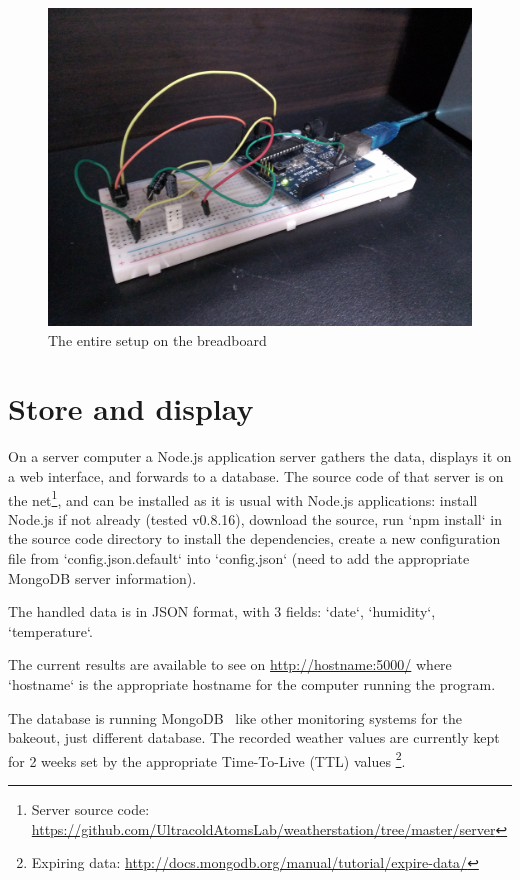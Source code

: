 \documentclass[12pt,a4paper]{article}
\begin{document}
\begin{figure}[ht!]
\centering
\includegraphics[width=140mm]{setup.jpg}
\caption{The entire setup on the breadboard}
\label{fig:setup}
\end{figure}

\section{Store and display}

On a server computer a Node.js application server gathers the data, displays it on a web interface, and forwards to a database. The source code of that server is on the net\footnote{Server source code: \url{https://github.com/UltracoldAtomsLab/weatherstation/tree/master/server}}, and can be installed as it is usual with Node.js applications: install Node.js if not already (tested v0.8.16), download the source, run `npm install` in the source code directory to install the dependencies, create a new configuration file from `config.json.default` into `config.json` (need to add the appropriate MongoDB server information).

The handled data is in JSON format, with 3 fields: `date`, `humidity`, `temperature`.

The current results are available to see on \url{http://hostname:5000/} where `hostname` is the appropriate hostname for the computer running the program.

The database is running MongoDB \, like other monitoring systems for the bakeout, just different database. The recorded weather values are currently kept for 2 weeks set by the appropriate Time-To-Live (TTL) values \footnote{Expiring data: \url{http://docs.mongodb.org/manual/tutorial/expire-data/}}.
\end{document}
